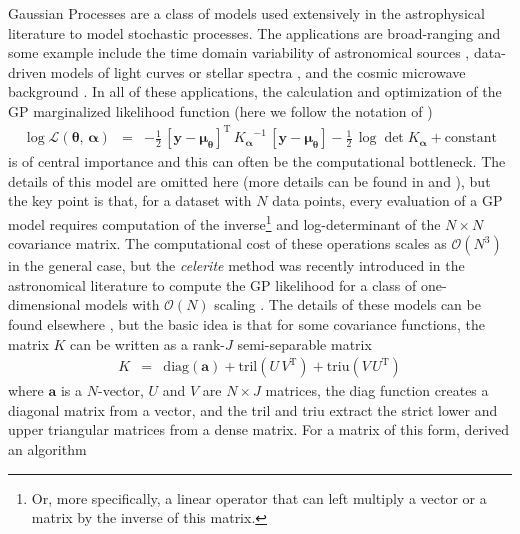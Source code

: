 \documentclass[rnaas]{aastex62}
\newcommand{\eqlabel}[1]{\label{eq:#1}}
\newcommand{\T}{\ensuremath{\mathrm{T}}}
\newcommand{\bvec}[1]{{\ensuremath{\boldsymbol{#1}}}}
\begin{document}
Gaussian Processes \citep[GPs][]{Rasmussen:2006} are a class of models used
extensively in the astrophysical literature to model stochastic processes.
The applications are broad-ranging and some example include the time domain
variability of astronomical sources \citep{Brewer:2009, Kelly:2014,
Haywood:2014, Rajpaul:2015, Foreman-Mackey:2017}, data-driven models of light
curves or stellar spectra \citep{Wang:2012, Luger:2016, Czekala:2017}, and the
cosmic microwave background \citep{Bond:1987,Wandelt:2003}.
In all of these applications, the calculation and optimization of the GP
marginalized likelihood function (here we follow the notation of
\citealt{Foreman-Mackey:2017})
\begin{eqnarray}\eqlabel{loglike}
\log \mathcal{L}(\bvec{\theta},\,\bvec{\alpha}) &=&
    -\frac{1}{2}\,\left[\bvec{y} - \bvec{\mu}_\bvec{\theta}\right]^\T\,
        {K_\bvec{\alpha}}^{-1}\,\left[\bvec{y}-\bvec{\mu}_\bvec{\theta}\right]
    -\frac{1}{2}\,\log\det K_\bvec{\alpha} + \mathrm{constant}
\end{eqnarray}
is of central importance and this can often be the computational bottleneck.
The details of this model are omitted here (more details can be found in
\citealt{Rasmussen:2006} and \citealt{Foreman-Mackey:2017}), but the key point
is that, for a dataset with $N$ data points, every evaluation of a GP model
requires computation of the inverse\footnote{Or, more specifically, a linear
operator that can left multiply a vector or a matrix by the inverse of this
matrix.} and log-determinant of the $N \times N$ covariance matrix.
The computational cost of these operations scales as $\mathcal{O}(N^3)$ in the
general case, but the \emph{celerite} method was recently introduced in the
astronomical literature to compute the GP likelihood for a class of
one-dimensional models with $\mathcal{O}(N)$ scaling
\citep{Foreman-Mackey:2017}.
The details of these models can be found elsewhere
\citep{Foreman-Mackey:2017}, but the basic idea is that for some covariance
functions, the matrix $K$ can be written as a rank-$J$ semi-separable matrix
\begin{eqnarray}\eqlabel{semi-K}
K &=& \mathrm{diag}(\bvec{a}) + \mathrm{tril}(U\,V^\T) +
    \mathrm{triu}(V\,U^\T)
\end{eqnarray}
where $\bvec{a}$ is a $N$-vector, $U$ and $V$ are $N \times J$ matrices, the
diag function creates a diagonal matrix from a vector, and the tril and triu
extract the strict lower and upper triangular matrices from a dense matrix.
For a matrix of this form, \citet{Foreman-Mackey:2017} derived an algorithm
\end{document}
